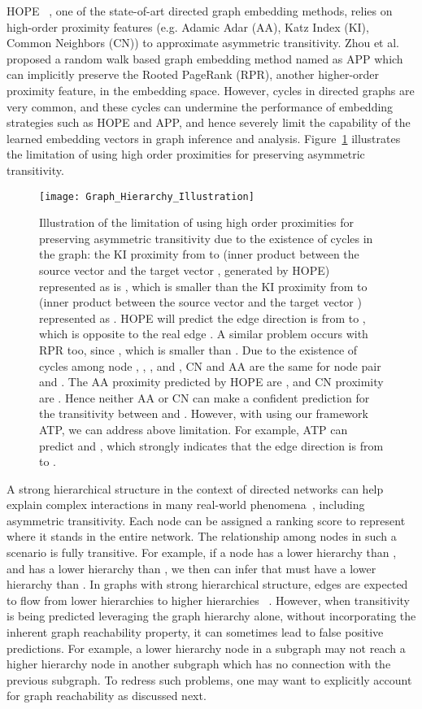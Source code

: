 \documentclass[letterpaper]{article} \usepackage{aaai19}  \usepackage{times}  \usepackage{helvet}  \usepackage{courier}  \usepackage{url}  \usepackage{graphicx}  \usepackage{booktabs} \usepackage{xcolor}
\begin{document}
HOPE ~\cite{Ou2016KDDAsymmetric}, one of the state-of-art directed graph embedding methods, relies on high-order proximity features (e.g. Adamic Adar (AA), Katz Index (KI), Common Neighbors (CN)) to approximate asymmetric transitivity. Zhou et al. ~\cite{Zhou2017ScalableGE} proposed a random walk based graph embedding method named as APP which can implicitly preserve the Rooted PageRank (RPR), another higher-order proximity feature,  in the embedding space.
However, cycles in directed graphs are very common, and these cycles can undermine the performance of embedding strategies such as HOPE and APP, and hence severely limit the capability of the learned embedding vectors in graph inference and analysis. Figure~\ref{fig:inferring_graph_hierarchy} illustrates the limitation of using high order proximities for preserving asymmetric transitivity. 


\begin{figure}[t!]
    \centering
    \texttt{[image: Graph\_Hierarchy\_Illustration]}\caption{\small Illustration of the limitation of using high order proximities for preserving asymmetric transitivity due to the existence of cycles in the graph: the KI proximity from  to  (inner product between the source vector  and the target vector , generated by HOPE) represented as  is , which is smaller than the KI proximity from  to  (inner product between the source vector  and the target vector ) represented as . HOPE will predict the edge direction is from  to , which is opposite to the real edge . A similar problem occurs with RPR too, since , which is smaller than . Due to the existence of cycles among node , , , and , CN and AA are the same for node pair  and . The AA proximity predicted by HOPE are , and CN proximity are . Hence neither AA or CN can make a confident prediction for the transitivity between  and . However, with using our framework ATP, we can address above limitation. For example, ATP can predict  and , which strongly indicates that the edge direction is from  to .}
    \label{fig:inferring_graph_hierarchy}
\end{figure}



A strong hierarchical structure in the context of directed networks can help explain complex interactions in many real-world phenomena~\cite{tatti2015}, including asymmetric transitivity. Each node can be assigned a ranking score to represent where it stands in the entire network. The relationship among nodes in such a scenario is fully transitive. For example, if a node  has a lower hierarchy than , and  has a lower hierarchy than , we then can infer that  must have a lower hierarchy than . In graphs with strong hierarchical structure, edges are expected to flow from lower hierarchies to higher hierarchies ~\cite{Gupte2011agony,tatti2015}. However, when transitivity is being predicted leveraging the graph hierarchy alone, without incorporating the inherent graph reachability property, it can sometimes lead to false positive predictions. For example, a lower hierarchy node in a subgraph may not reach a higher hierarchy node in another subgraph which has no connection with the previous subgraph. To redress such problems, one may want to explicitly account for graph reachability as discussed next.
\end{document}
